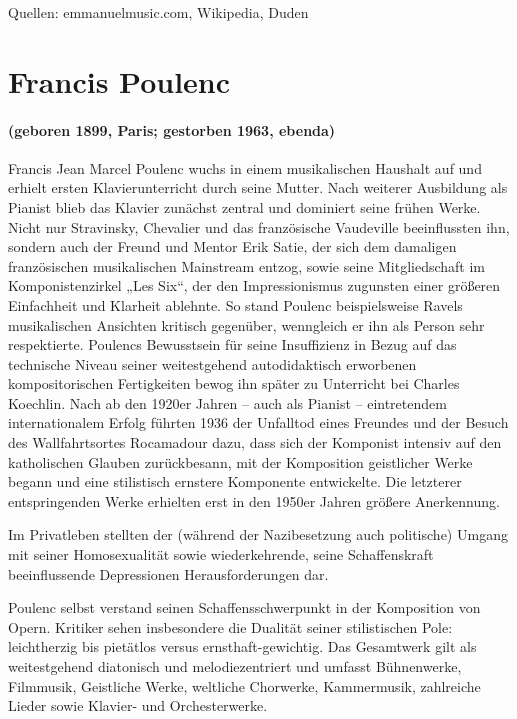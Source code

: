 \documentclass[11pt, ngermanm, titlepage]{article}
\begin{document}
\begin{multicols}{2}
	Quellen: emmanuelmusic.com,	Wikipedia, Duden
	
	
	\section*{Francis Poulenc}
	\paragraph{(geboren 1899, Paris; gestorben 1963, ebenda)\newline}
	Francis Jean Marcel Poulenc wuchs in einem musikalischen Haushalt auf und erhielt ersten Klavierunterricht durch seine Mutter. Nach weiterer Ausbildung als Pianist blieb das Klavier zunächst zentral und dominiert seine frühen Werke. Nicht nur Stravinsky, Chevalier und das französische Vaudeville beeinflussten ihn, sondern auch der Freund und Mentor Erik Satie, der sich dem damaligen französischen musikalischen Mainstream entzog, sowie seine Mitgliedschaft im Komponistenzirkel „Les Six“, der den Impressionismus zugunsten einer größeren Einfachheit und Klarheit ablehnte. So stand Poulenc beispielsweise Ravels musikalischen Ansichten kritisch gegenüber, wenngleich er ihn als Person sehr respektierte. Poulencs Bewusstsein für seine Insuffizienz in Bezug auf das technische Niveau seiner weitestgehend autodidaktisch erworbenen kompositorischen Fertigkeiten bewog ihn später zu Unterricht bei Charles Koechlin. Nach ab den 1920er Jahren – auch als Pianist – eintretendem internationalem Erfolg führten 1936 der Unfalltod eines Freundes und der Besuch des Wallfahrtsortes Rocamadour dazu, dass sich der Komponist intensiv auf den katholischen Glauben zurückbesann, mit der Komposition geistlicher Werke begann und eine stilistisch ernstere Komponente entwickelte. Die letzterer entspringenden Werke erhielten erst in den 1950er Jahren größere Anerkennung.
	
	Im Privatleben stellten der (während der Nazibesetzung auch politische) Umgang mit seiner Homosexualität sowie wiederkehrende, seine Schaffenskraft beeinflussende Depressionen Herausforderungen dar.
	
	Poulenc selbst verstand seinen Schaffensschwerpunkt in der Komposition von Opern. Kritiker sehen insbesondere die Dualität seiner stilistischen Pole: leichtherzig bis pietätlos versus ernsthaft-gewichtig. Das Gesamtwerk gilt als weitestgehend diatonisch und melodiezentriert und umfasst Bühnenwerke, Filmmusik, Geistliche Werke, weltliche Chorwerke, Kammermusik, zahlreiche Lieder sowie Klavier- und Orchesterwerke.
	

\end{multicols}
\end{document}
